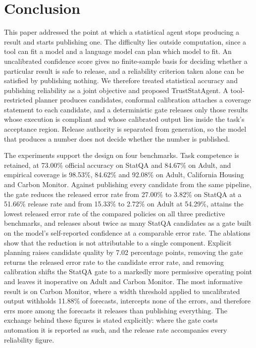 \documentclass[preprint,12pt,authoryear]{elsarticle}
\begin{document}
\section{Conclusion}
\label{sec:conclusion}

This paper addressed the point at which a statistical agent stops producing a result and starts publishing one.
The difficulty lies outside computation, since a tool can fit a model and a language model can plan which model to fit.
An uncalibrated confidence score gives no finite-sample basis for deciding whether a particular result is safe to release, and a reliability criterion taken alone can be satisfied by publishing nothing.
We therefore treated statistical accuracy and publishing reliability as a joint objective and proposed TrustStatAgent.
A tool-restricted planner produces candidates, conformal calibration attaches a coverage statement to each candidate, and a deterministic gate releases only those results whose execution is compliant and whose calibrated output lies inside the task's acceptance region.
Release authority is separated from generation, so the model that produces a number does not decide whether the number is published.

The experiments support the design on four benchmarks.
Task competence is retained, at 73.00\% official accuracy on StatQA and 84.67\% on Adult, and empirical coverage is 98.53\%, 84.62\% and 92.08\% on Adult, California Housing and Carbon Monitor.
Against publishing every candidate from the same pipeline, the gate reduces the released error rate from 27.00\% to 3.82\% on StatQA at a 51.66\% release rate and from 15.33\% to 2.72\% on Adult at 54.29\%, attains the lowest released error rate of the compared policies on all three predictive benchmarks, and releases about twice as many StatQA candidates as a gate built on the model's self-reported confidence at a comparable error rate.
The ablations show that the reduction is not attributable to a single component.
Explicit planning raises candidate quality by 7.02 percentage points, removing the gate returns the released error rate to the candidate error rate, and removing calibration shifts the StatQA gate to a markedly more permissive operating point and leaves it inoperative on Adult and Carbon Monitor.
The most informative result is on Carbon Monitor, where a width threshold applied to uncalibrated output withholds 11.88\% of forecasts, intercepts none of the errors, and therefore errs more among the forecasts it releases than publishing everything.
The exchange behind these figures is stated explicitly: where the gate costs automation it is reported as such, and the release rate accompanies every reliability figure.
\end{document}
